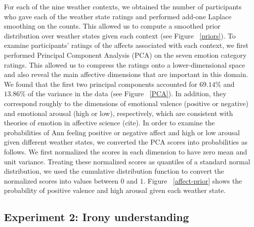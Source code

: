 \documentclass[10pt,letterpaper]{article}
\begin{document}
For each of the nine weather contexts, we obtained the number of participants who gave each of the weather state ratings and performed add-one Laplace smoothing on the counts. This allowed us to compute a smoothed prior distribution over weather states given each context (see Figure ~\ref{priors}). 
%
To examine participants' ratings of the affects associated with each context, we first performed Principal Component Analysis (PCA) on the seven emotion category ratings. This allowed us to compress the ratings onto a lower-dimensional space and also reveal the main affective dimensions that are important in this domain. We found that the first two principal components accounted for $69.14\%$ and $13.86\%$ of the variance in the data (see Figure ~\ref{PCA}). In addition, they correspond roughly to the dimensions of emotional valence (positive or negative) and emotional arousal (high or low), respectively, which are consistent with theories of emotion in affective science (cite). 
In order to examine the probabilities of Ann feeling positive or negative affect and high or low arousal given different weather states, we converted the PCA scores into probabilities as follows. We first normalized the scores in each dimension to have zero mean and unit variance. Treating these normalized scores as quantiles of a standard normal distribution, we used the cumulative distribution function to convert the normalized scores into values between $0$ and $1$. 
 Figure ~\ref{affect-prior} shows the probability of positive valence and high arousal given each weather state.

%

\subsection{Experiment 2: Irony understanding}
\end{document}
